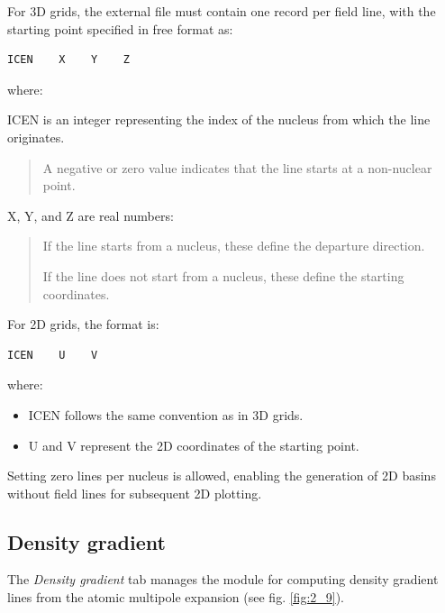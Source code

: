 \documentclass[10pt]{article}
\begin{document}
For 3D grids, the external file must contain one record per field line,
with the starting point specified in free format as:

\begin{verbatim}
ICEN    X    Y    Z   
\end{verbatim}

where:

\begin{itemize}
\item ICEN is an integer representing the index of the nucleus from which the line originates.
\vspace*{-5mm}
\begin{quote}
\item A negative or zero value indicates that the line starts at a non-nuclear point.
\end{quote}

\item X, Y, and Z are real numbers:
\begin{quote}
\item If the line starts from a nucleus, these define the departure direction.
\item If the line does not start from a nucleus, these define the starting coordinates.
\end{quote}
\end{itemize}

For 2D grids, the format is:

\begin{verbatim}
ICEN    U    V   
\end{verbatim}

where:

\begin{itemize}
\item ICEN follows the same convention as in 3D grids.
\item U and V represent the 2D coordinates of the starting point.
\end{itemize}

Setting zero lines per nucleus is allowed, enabling the generation of 2D basins without field lines
for subsequent 2D plotting.

\subsection{Density gradient \label{sec:2.9}}



The {\it Density gradient} tab manages the module for computing
density gradient lines
from the atomic multipole expansion (see fig. \ref{fig:2_9}).
\end{document}
